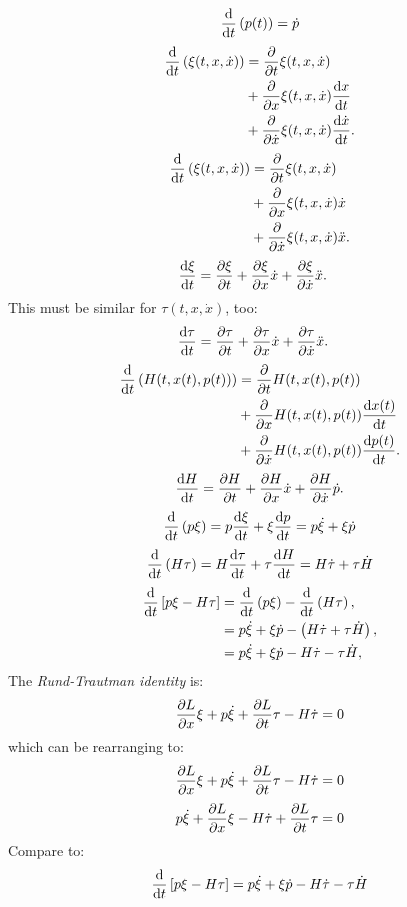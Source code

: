 \begin{align*}
	\frac{\mathrm{d}}{\mathrm{d}t}\left(p(t)\right)  = \dot{p}
\end{align*}
\begin{align*}
	\frac{\mathrm{d}}{\mathrm{d}t}\left(\xi(t,x,\dot{x})\right)  &= \frac{\partial }{\partial t}\xi(t,x,\dot{x})\\
	&+ \frac{\partial }{\partial x}\xi(t,x,\dot{x})\frac{\mathrm{d}x}{\mathrm{d}t}\\
	&+ \frac{\partial }{\partial \dot{x}}\xi(t,x,\dot{x})\frac{\mathrm{d}\dot{x}}{\mathrm{d}t}.
\end{align*}
\begin{align*}
	\frac{\mathrm{d}}{\mathrm{d}t}\left(\xi(t,x,\dot{x})\right)  &= \frac{\partial }{\partial t}\xi(t,x,\dot{x})\\
	&+ \frac{\partial }{\partial x}\xi(t,x,\dot{x})\dot{x}\\
	&+ \frac{\partial }{\partial \dot{x}}\xi(t,x,\dot{x})\ddot{x}.
\end{align*}
\begin{align*}
	\frac{\mathrm{d}\xi}{\mathrm{d}t}  &= \frac{\partial \xi}{\partial t}
	+ \frac{\partial \xi}{\partial x}\dot{x}
	+ \frac{\partial \xi}{\partial \dot{x}}\ddot{x}.
\end{align*}
This must be similar for $\tau(t,x,\dot{x})$, too:
\begin{align*}
	\frac{\mathrm{d}\tau}{\mathrm{d}t}  &= \frac{\partial \tau}{\partial t}
	+ \frac{\partial \tau}{\partial x}\dot{x}
	+ \frac{\partial \tau}{\partial \dot{x}}\ddot{x}.
\end{align*}
\begin{align*}
	\frac{\mathrm{d}}{\mathrm{d}t}\left(H(t,x(t),p(t))\right)  &= \frac{\partial }{\partial t}H(t,x(t),p(t))\\
	&+ \frac{\partial }{\partial x}H(t,x(t),p(t))\frac{\mathrm{d}x(t)}{\mathrm{d}t}\\
	&+ \frac{\partial }{\partial \dot{x}}H(t,x(t),p(t))\frac{\mathrm{d}p(t)}{\mathrm{d}t}.
\end{align*}
\begin{align*}
	\frac{\mathrm{d}H}{\mathrm{d}t} = \frac{\partial H}{\partial t} + \frac{\partial H}{\partial x}\dot{x} + \frac{\partial H}{\partial \dot{x}}\dot{p}.
\end{align*}
\begin{align*}
	\frac{\mathrm{d}}{\mathrm{d}t}\left(p\xi\right) =p\frac{\mathrm{d}\xi}{\mathrm{d}t} + \xi\frac{\mathrm{d}p}{\mathrm{d}t} = p\dot{\xi} +\xi\dot{p}
\end{align*}
 \begin{align*}
	\frac{\mathrm{d}}{\mathrm{d}t}\left(H\tau\right) = H\frac{\mathrm{d}\tau}{\mathrm{d}t} + \tau\frac{\mathrm{d}H}{\mathrm{d}t} = H\dot{\tau} +\tau\dot{H}
\end{align*}
\begin{align*}
	\frac{\mathrm{d}}{\mathrm{d}t}\left[p\xi -H\tau\right] &= \frac{\mathrm{d}}{\mathrm{d}t}\left(p\xi\right) - \frac{\mathrm{d}}{\mathrm{d}t}\left(H\tau\right),\\
	&= p\dot{\xi} +\xi\dot{p} - \left(H\dot{\tau} +\tau\dot{H}\right),\\
	&= p\dot{\xi} +\xi\dot{p} - H\dot{\tau} - \tau\dot{H},\\
\end{align*}
The \textit{Rund-Trautman identity} is:
\[
	\frac{\partial L}{\partial x}\xi + p\dot{\xi} + \frac{\partial L}{\partial t}\tau - H\dot{\tau} = 0
\]
which can be rearranging to:
\[
	\frac{\partial L}{\partial x}\xi + p\dot{\xi} + \frac{\partial L}{\partial t}\tau - H\dot{\tau} = 0
\]
\[
	p\dot{\xi} + \frac{\partial L}{\partial x}\xi  - H\dot{\tau}+ \frac{\partial L}{\partial t}\tau= 0
\]
Compare to:
\[
\frac{\mathrm{d}}{\mathrm{d}t}\left[p\xi -H\tau\right] = p\dot{\xi} +\xi\dot{p} - H\dot{\tau} - \tau\dot{H}
\]
